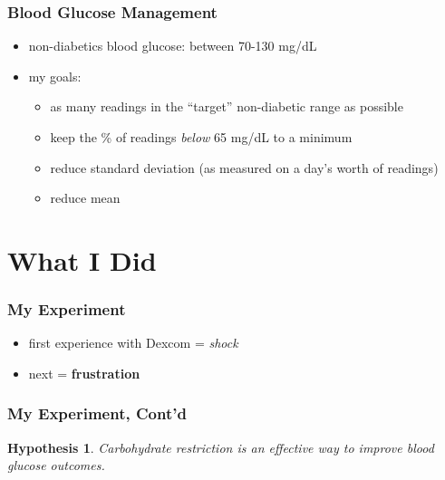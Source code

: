 \documentclass[handout]{beamer}
\newtheorem{hypothesis}{Hypothesis}
\begin{document}
\begin{frame}
  \frametitle{Blood Glucose Management}

  \begin{itemize}
  \item non-diabetics blood glucose: between 70-130 mg/dL
  \pause
  \item my goals:
  \pause
    \begin{itemize}
    \item as many readings in the ``target'' non-diabetic range as possible
    \pause
    \item keep the \% of readings \textit{below} 65 mg/dL to a minimum
    \pause
    \item reduce standard deviation (as measured on a day's worth of readings)
    \pause
    \item reduce mean
    \end{itemize}
  \end{itemize}

\end{frame}

\section{What I Did}

\begin{frame}
  \frametitle{My Experiment}

  \begin{itemize}
  \item first experience with Dexcom \pause = \textit{shock}
  \pause
  \item next \pause = \textbf{frustration}
  \end{itemize}
  
\end{frame}

\begin{frame}
  \frametitle{My Experiment, Cont'd}

  \begin{hypothesis}
    Carbohydrate restriction is an effective way to improve blood glucose outcomes.
  \end{hypothesis}

\end{frame}
\end{document}
